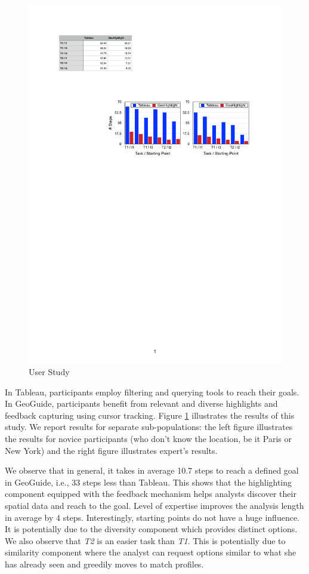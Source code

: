 \documentclass[conference,compsoc]{IEEEtran}
\newcommand{\framework}{{\sc GeoGuide}}
\begin{document}
\begin{figure}[t]
	\centering
	\includegraphics[width=\columnwidth]{figs/userstudy}
	\caption{User Study}
	\vspace{-5pt}
	\label{fig:userstudy}
\end{figure}

In {\sc Tableau}, participants employ filtering and querying tools to reach their goals. In \framework, participants benefit from relevant and diverse highlights and feedback capturing using cursor tracking. Figure \ref{fig:userstudy} illustrates the results of this study. We report results for separate sub-populations: the left figure illustrates the results for novice participants (who don't know the location, be it Paris or New York) and the right figure illustrates expert's results.

We observe that in general, it takes in average 10.7 steps to reach a defined goal in \framework, i.e., 33 steps less than {\sc Tableau}. This shows that the highlighting component equipped with the feedback mechanism helps analysts discover their spatial data and reach to the goal. Level of expertise improves the analysis length in average by 4 steps. Interestingly, starting points do not have a huge influence. It is potentially due to the diversity component which provides distinct options. We also observe that {\em T2} is an easier task than {\em T1}. This is potentially due to similarity component where the analyst can request options similar to what she has already seen and greedily moves to match profiles.
\end{document}
